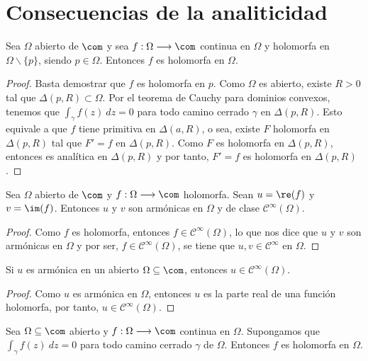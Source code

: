 \section{Consecuencias de la analiticidad}

\begin{teo}
Sea $\Omega$ abierto de $\com$ y sea $f: \Omega \longrightarrow \com$ continua en $\Omega$ y holomorfa en $\Omega \backslash \{p\}$, siendo $p \in \Omega$. Entonces $f$ es holomorfa en $\Omega$.
\end{teo}

\begin{proof}
Basta demostrar que $f$ es holomorfa en $p$. Como $\Omega$ es abierto, existe $R > 0$ tal que $\Delta(p,R) \subset \Omega$. Por el teorema de Cauchy para dominios convexos, tenemos que $\int_{\gamma}{f(z) \ dz} = 0$ para todo camino cerrado $\gamma$ en $\Delta(p,R)$. Esto equivale a que $f$ tiene primitiva en $\Delta(a,R)$, o sea, existe $F$ holomorfa en $\Delta(p,R)$ tal que $F' = f$ en $\Delta(p,R)$. Como $F$ es holomorfa en $\Delta(p,R)$, entonces es analítica en $\Delta(p,R)$ y por tanto, $F' = f$ es holomorfa en $\Delta(p,R)$.
\end{proof}

\begin{teo}
Sea $\Omega$ abierto de $\com$ y $f: \Omega \longrightarrow \com$ holomorfa. Sean $u = \re(f)$ y $v = \im(f)$. Entonces $u$ y $v$ son armónicas en $\Omega$ y de clase $\mathscr{C}^{\infty}(\Omega)$.
\end{teo}

\begin{proof}
Como $f$ es holomorfa, entonces $f \in \mathscr{C}^{\infty}(\Omega)$, lo que nos dice que $u$ y $v$ son armónicas en $\Omega$ y por ser, $f \in \mathscr{C}^{\infty}(\Omega)$, se tiene que $u,v \in \mathscr{C}^{\infty}$ en $\Omega$.
\end{proof}

\begin{cor}
Si $u$ es armónica en un abierto $\Omega \subseteq \com$, entonces $u \in \mathscr{C}^{\infty}(\Omega)$.
\end{cor}

\begin{proof}
Como $u$ es armónica en $\Omega$, entonces $u$ es la parte real de una función holomorfa, por tanto, $u \in \mathscr{C}^{\infty}(\Omega)$.
\end{proof}

\begin{teo}[de Morera]
Sea $\Omega \subseteq \com$ abierto y $f: \Omega \longrightarrow \com$ continua en $\Omega$. Supongamos que $\int_{\gamma}{f(z) \ dz} = 0$ para todo camino cerrado $\gamma$ de $\Omega$. Entonces $f$ es holomorfa en $\Omega$.
\end{teo}

